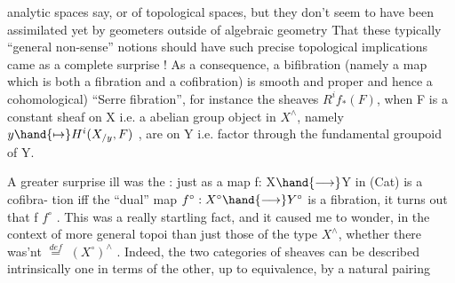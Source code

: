 analytic spaces say, or of topological spaces, but they don't seem to
have been assimilated yet by geometers outside of algebraic geometry\hand{)}
That these typically ``general non-sense'' notions should have such precise
topological implications came as a complete surprise ! As a consequence,
a bifibration (namely a map which is both a fibration and a cofibration)
is smooth and proper and hence a \hand{(}cohomological) ``Serre fibration'', for
instance the sheaves $R^{i}f_{*}(F)$, when F is a constant  sheaf on X \hand{(}i.e. a
 abelian group object in $X^{\wedge}$\hand{)}, namely $y\hand{\mapsto}H^{i}(X_{/y},F)$ , are \hand{\uline{\textcolor{black}{local}}} \hand{\uline{\textcolor{black}{systems}}} 
on Y i.e. factor through the fundamental groupoid of Y. \unsure{*}

A  greater surprise ill was the \hand{\uline{\textcolor{black}{duality between the notions of
properness and smoothness}}}: just as a map f: X$\hand{\longrightarrow}$Y in (Cat) is a cofibra-%
tion iff the ``dual'' map $f^{\circ}: X^{\circ}\hand{\longrightarrow}Y^{\circ}$ is a fibration, it turns out that
f \hand{\uline{\textcolor{black}{is proper iff}}} $f^{\circ}$ \hand{\uline{\textcolor{black}{is smooth}}}. This was a really startling fact, and it
caused me to wonder, in the context of more general topoi than just those
of the type $X^{\wedge}$, whether there was'nt \hand{\uline{\textcolor{black}{a notion of duality generalizing}}}
  $\overset{def}{=}$ $(X^{\circ})^{\wedge}$ . Indeed, the
two categories of sheaves can be described intrinsically one in terms of
the other, up to equivalence, by a natural pairing

